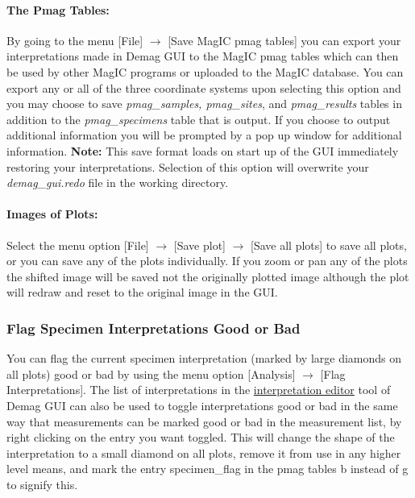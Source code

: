 \documentclass[11pt]{book}
\begin{document}
{{\paragraph{The Pmag Tables:}\label{the-pmag-tables} By going to the menu [File] $\rightarrow$ [Save MagIC pmag tables] you can export your interpretations made in Demag GUI to the MagIC pmag tables which can then be used by other MagIC programs or uploaded to the MagIC database. You can export any or all of the three coordinate systems upon selecting this option and you may choose to save {\it pmag\_samples, pmag\_sites}, and {\it pmag\_results}  tables in addition to the {\it pmag\_specimens } table that is output. If you choose to output additional information you will be prompted by a pop up window for additional information. \textbf{Note:} This save format loads on start up of the GUI immediately restoring your interpretations. Selection of this option will overwrite your {\it demag\_gui.redo} file in the working directory.

\paragraph{Images of Plots:}\label{images-of-plots} Select the menu option [File] $\rightarrow$ [Save plot] $\rightarrow$ [Save all plots] to save all plots, or you can save any of the plots individually. If you zoom or pan any of the plots the shifted image will be saved not the originally plotted image although the plot will redraw and reset to the original image in the GUI.

\subsubsection{Flag Specimen Interpretations Good or Bad}\label{flag-spec-interps}

You can flag the current specimen interpretation (marked by large diamonds on all plots) good or bad by using the menu option [Analysis] $\rightarrow$ [Flag Interpretations]. The list of interpretations in the \hyperref[interpretation-editor]{interpretation editor} tool of Demag GUI can also be used to toggle interpretations good or bad in the same way that measurements can be marked good or bad in the measurement list, by right clicking on the entry you want toggled. This will change the shape of the interpretation to a small diamond on all plots, remove it from use in any higher level means, and mark the entry specimen_flag in the pmag tables b instead of g to signify this.

}}
\end{document}
